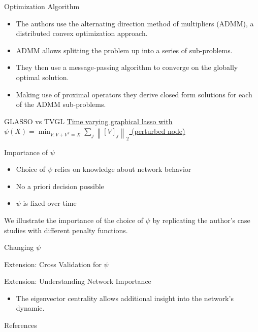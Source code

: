 \documentclass{beamer}
\begin{document}
\begin{frame}{Optimization Algorithm}
    \begin{itemize}
        \item The authors use the alternating direction method of multipliers (ADMM), a distributed convex optimization approach.
        \item ADMM allows splitting the problem up into a series of sub-problems.
        \item They then use a message-passing algorithm to converge on the globally optimal solution.
        \item Making use of proximal operators they derive closed form solutions for each of the ADMM sub-problems.
    \end{itemize}
\end{frame}

\begin{frame}{GLASSO vs TVGL}
    \href{https://www.dropbox.com/s/bin9o25phkf9lk3/Heatmaps.mp4?dl=0}{Time varying graphical lasso with $\psi(X)=\min _{V: V+V^{T}=X} \sum_{j}\left\|[V]_{j}\right\|_{2}$ (perturbed node)}
\end{frame}

\begin{frame}{Importance of $\psi$}
    \begin{itemize}
        \item Choice of $\psi$ relies on knowledge about network behavior
        \item No a priori decision possible
        \item $\psi$ is fixed over time
    \end{itemize}
    We illustrate the importance of the choice of $\psi$ by replicating the author's case studies with different
    penalty functions.
\end{frame}

\begin{frame}{Changing $\psi$}

\end{frame}

\begin{frame}{Extension: Cross Validation for $\psi$}

\end{frame}

\begin{frame}{Extension: Understanding Network Importance}
    \begin{itemize}
        \item The eigenvector centrality allows additional insight into the network's dynamic.
    \end{itemize}
\end{frame}

\begin{frame}{References}
    \nocite{*}
    
    
\end{frame}
\end{document}
